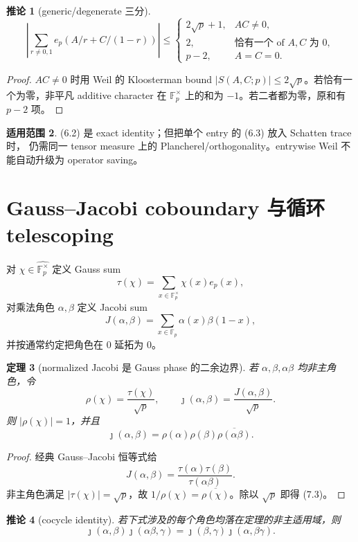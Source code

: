 \documentclass[11pt,a4paper]{ctexart}
\newtheorem{theorem}{定理}[section]
\newtheorem{corollary}[theorem]{推论}
\theoremstyle{definition}
\newtheorem{remark}[theorem]{适用范围}
\newcommand{\F}{\mathbb F}
\newcommand{\G}{\F_p^\times}
\newcommand{\Gh}{\widehat{\G}}
\newcommand{\ep}{e_p}
\newcommand{\1}{\mathbf 1}
\begin{document}
\begin{corollary}[generic/degenerate 三分]
\[
\left|\sum_{r\ne0,1}\ep(A/r+C/(1-r))\right|
\le
\begin{cases}
2\sqrt p+1,&AC\ne0,\\
2,&\text{恰有一个 of }A,C\text{ 为 }0,\\
p-2,&A=C=0.
\end{cases}
\tag{6.3}
\]
\end{corollary}

\begin{proof}
$AC\ne0$ 时用 Weil 的 Kloosterman bound
$|S(A,C;p)|\le2\sqrt p$。若恰有一个为零，非平凡 additive character
在 $\G$ 上的和为 $-1$。若二者都为零，原和有 $p-2$ 项。
\end{proof}

\begin{remark}
(6.2) 是 exact identity；但把单个 entry 的 (6.3) 放入 Schatten trace 时，
仍需同一 tensor measure 上的 Plancherel/orthogonality。entrywise Weil
不能自动升级为 operator saving。
\end{remark}

\section{Gauss--Jacobi coboundary 与循环 telescoping}

对 $\chi\in\Gh$ 定义 Gauss sum
\[
\tau(\chi)=\sum_{x\in\G}\chi(x)\ep(x),
\tag{7.1}
\]
对乘法角色 $\alpha,\beta$ 定义 Jacobi sum
\[
J(\alpha,\beta)=\sum_{x\in\F_p}\alpha(x)\beta(1-x),
\tag{7.2}
\]
并按通常约定把角色在 $0$ 延拓为 $0$。

\begin{theorem}[normalized Jacobi 是 Gauss phase 的二余边界]
若 $\alpha,\beta,\alpha\beta$ 均非主角色，令
\[
\rho(\chi)=\frac{\tau(\chi)}{\sqrt p},
\qquad
\jmath(\alpha,\beta)=\frac{J(\alpha,\beta)}{\sqrt p}.
\]
则 $|\rho(\chi)|=1$，并且
\[
\boxed{
\jmath(\alpha,\beta)
=\rho(\alpha)\rho(\beta)\overline{\rho(\alpha\beta)}.}
\tag{7.3}
\]
\end{theorem}

\begin{proof}
经典 Gauss--Jacobi 恒等式给
\[
J(\alpha,\beta)=\frac{\tau(\alpha)\tau(\beta)}{\tau(\alpha\beta)}.
\]
非主角色满足 $|\tau(\chi)|=\sqrt p$，故
$1/\rho(\chi)=\overline{\rho(\chi)}$。除以 $\sqrt p$ 即得 (7.3)。
\end{proof}

\begin{corollary}[cocycle identity]
若下式涉及的每个角色均落在定理的非主适用域，则
\[
\boxed{
\jmath(\alpha,\beta)\jmath(\alpha\beta,\gamma)
=\jmath(\beta,\gamma)\jmath(\alpha,\beta\gamma).}
\tag{7.4}
\]
\end{corollary}
\end{document}

